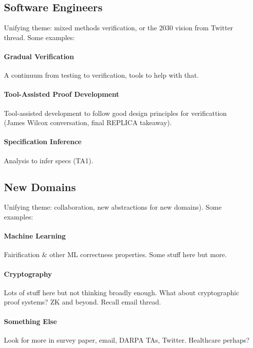 \subsection*{Software Engineers}

Unifying theme: mixed methods verification, or the 2030 vision from Twitter thread. Some examples:

\paragraph{Gradual Verification} A continuum from testing to verification, tools to help with that.

\paragraph{Tool-Assisted Proof Development} Tool-assisted development to follow good design principles for verificattion (James Wilcox conversation, final REPLICA takeaway).

\paragraph{Specification Inference} Analysis to infer specs (TA1).

\subsection*{New Domains}

Unifying theme: collaboration, new abstractions for new domains). Some examples:

\paragraph{Machine Learning} Fairification \& other ML correctness properties. Some stuff here but more.

\paragraph{Cryptography} Lots of stuff here but not thinking broadly enough. What about cryptographic proof systems? ZK and beyond. Recall email thread.

\paragraph{Something Else} Look for more in survey paper, email, DARPA TAs, Twitter. Healthcare perhaps? %
